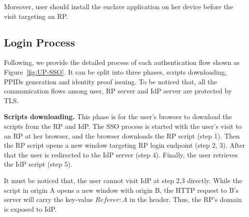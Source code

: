 Moreover, user should install the enclave application on her device before the visit targeting an RP. 

\subsection{Login Process}
Following, we provide the detailed process of each authentication flow shown as Figure~\ref{fig:UP-SSO}.
It can be split into three phases, scripts downloading, PPIDs generation and identity proof issuing. To be noticed that, all the communication flows among user, RP server and IdP server are protected by TLS.

\vspace{0.5mm}\noindent\textbf{Scripts downloading.} This phase is for the user’s browser to download the scripts from the RP and IdP. The SSO process is started with the user's visit to an RP at her browser, and the browser downloads the RP script (step 1). Then the RP script opens a new window targeting RP login endpoint (step 2, 3). After that the user is redirected to the IdP server (step 4). Finally, the user retrieves the IdP script (step 5).

It must be noticed that, the user cannot visit IdP at step 2,3 directly. While the script in origin A opens a new window with origin B, the HTTP request to B's server will carry the key-value $Referer: A$ in the header. Thus, the RP's domain is exposed to IdP. 

